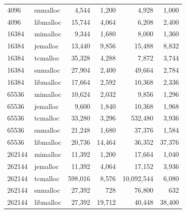\begin{table}[!htbp]
\begin{tabular}{llrrrr}
4096 & snmalloc & 4{,}544 & 1{,}200 & 4{,}928 & 1{,}000 \\
4096 & libmalloc & 15{,}744 & 4{,}064 & 6{,}208 & 2{,}400 \\
16384 & mimalloc & 9{,}344 & 1{,}680 & 8{,}000 & 1{,}360 \\
16384 & jemalloc & 13{,}440 & 9{,}856 & 15{,}488 & 8{,}832 \\
16384 & tcmalloc & 35{,}328 & 4{,}288 & 7{,}872 & 3{,}744 \\
16384 & snmalloc & 27{,}904 & 2{,}400 & 49{,}664 & 2{,}784 \\
16384 & libmalloc & 17{,}664 & 2{,}592 & 10{,}368 & 2{,}336 \\
65536 & mimalloc & 10{,}624 & 2{,}032 & 9{,}856 & 1{,}296 \\
65536 & jemalloc & 9{,}600 & 1{,}840 & 10{,}368 & 1{,}968 \\
65536 & tcmalloc & 33{,}280 & 3{,}296 & 532{,}480 & 3{,}936 \\
65536 & snmalloc & 21{,}248 & 1{,}680 & 37{,}376 & 1{,}584 \\
65536 & libmalloc & 20{,}736 & 14{,}464 & 36{,}352 & 37{,}376 \\
262144 & mimalloc & 11{,}392 & 1{,}200 & 17{,}664 & 1{,}040 \\
262144 & jemalloc & 11{,}392 & 4{,}064 & 17{,}152 & 3{,}936 \\
262144 & tcmalloc & 598{,}016 & 8{,}576 & 10{,}092{,}544 & 6{,}080 \\
262144 & snmalloc & 27{,}392 & 728 & 76{,}800 & 632 \\
262144 & libmalloc & 27{,}392 & 19{,}712 & 40{,}448 & 38{,}400 \\
\bottomrule
\end{tabular}
\end{table}

